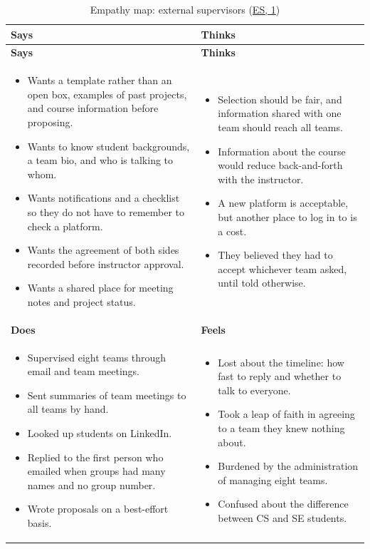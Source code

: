 \documentclass{article}
\newcommand{\intlink}[3]{\hyperref[int:#1-#2]{#3}}
\newcommand{\intref}[2]{\intlink{#1}{#2}{#1, #2}}
\newcommand{\empathymap}[6]{%
    \begin{longtable}{|p{0.465\textwidth}|p{0.465\textwidth}|}
    \caption{#1}\label{#2}\\
    \hline
    \textbf{Says} & \textbf{Thinks}\\ \hline
    \endfirsthead
    \hline
    \textbf{Says} & \textbf{Thinks}\\ \hline
    \endhead
    #3 & #4 \\ \hline
    \textbf{Does} & \textbf{Feels}\\ \hline
    #5 & #6 \\ \hline
    \end{longtable}}
\begin{document}
    \empathymap{Empathy map: external supervisors (\intref{ES}{1})}{tab:map-es}
    {\begin{itemize}
         \item Wants a template rather than an open box, examples of past projects, and course information
         before proposing.
         \item Wants to know student backgrounds, a team bio, and who is talking to whom.
         \item Wants notifications and a checklist so they do not have to remember to check a platform.
         \item Wants the agreement of both sides recorded before instructor approval.
         \item Wants a shared place for meeting notes and project status.
    \end{itemize}}
    {\begin{itemize}
         \item Selection should be fair, and information shared with one team should reach all teams.
         \item Information about the course would reduce back-and-forth with the instructor.
         \item A new platform is acceptable, but another place to log in to is a cost.
         \item They believed they had to accept whichever team asked, until told otherwise.
    \end{itemize}}
    {\begin{itemize}
         \item Supervised eight teams through email and team meetings.
         \item Sent summaries of team meetings to all teams by hand.
         \item Looked up students on LinkedIn.
         \item Replied to the first person who emailed when groups had many names and no group number.
         \item Wrote proposals on a best-effort basis.
    \end{itemize}}
    {\begin{itemize}
         \item Lost about the timeline: how fast to reply and whether to talk to everyone.
         \item Took a leap of faith in agreeing to a team they knew nothing about.
         \item Burdened by the administration of managing eight teams.
         \item Confused about the difference between CS and SE students.
    \end{itemize}}
\end{document}
